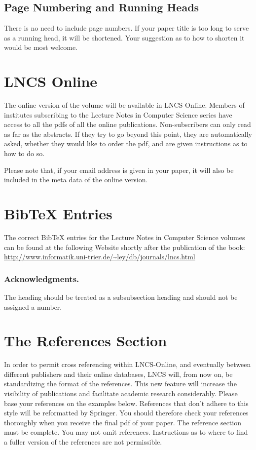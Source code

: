\documentclass[runningheads,a4paper]{llncs}
\begin{document}
\subsection{Page Numbering and Running Heads}

There is no need to include page numbers. If your paper title is too
long to serve as a running head, it will be shortened. Your suggestion
as to how to shorten it would be most welcome.

\section{LNCS Online}

The online version of the volume will be available in LNCS Online.
Members of institutes subscribing to the Lecture Notes in Computer
Science series have access to all the pdfs of all the online
publications. Non-subscribers can only read as far as the abstracts. If
they try to go beyond this point, they are automatically asked, whether
they would like to order the pdf, and are given instructions as to how
to do so.

Please note that, if your email address is given in your paper,
it will also be included in the meta data of the online version.

\section{BibTeX Entries}

The correct BibTeX entries for the Lecture Notes in Computer Science
volumes can be found at the following Website shortly after the
publication of the book:
\url{http://www.informatik.uni-trier.de/~ley/db/journals/lncs.html}

\subsubsection*{Acknowledgments.} The heading should be treated as a
subsubsection heading and should not be assigned a number.

\section{The References Section}\label{references}

In order to permit cross referencing within LNCS-Online, and eventually
between different publishers and their online databases, LNCS will,
from now on, be standardizing the format of the references. This new
feature will increase the visibility of publications and facilitate
academic research considerably. Please base your references on the
examples below. References that don't adhere to this style will be
reformatted by Springer. You should therefore check your references
thoroughly when you receive the final pdf of your paper.
The reference section must be complete. You may not omit references.
Instructions as to where to find a fuller version of the references are
not permissible.
\end{document}
